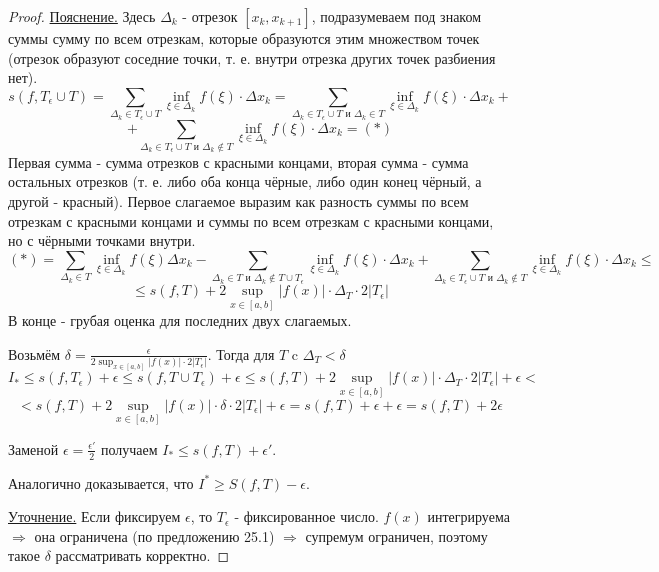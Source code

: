 \begin{proof}
    	\underline{Пояснение.} Здесь $\Delta_k$ - отрезок $[x_k, x_{k + 1}]$, подразумеваем под знаком суммы сумму по всем отрезкам, которые образуются этим множеством точек (отрезок образуют соседние точки, т. е. внутри отрезка других точек разбиения нет).
    	\[ s(f, T_{\epsilon} \cup T) = \sum_{\Delta_k \in T_{\epsilon} \cup T} \inf_{\xi \in \Delta_k} {f(\xi) \cdot \Delta x_k} = \sum_{\Delta_k \in T_{\epsilon} \cup T \text{ и } \Delta_k \in T} \inf_{\xi \in \Delta_k} {f(\xi) \cdot \Delta x_k} + \]
    	\[ + \sum_{\Delta_k \in T_{\epsilon} \cup T \text{ и } \Delta_k \not\in T} \inf_{\xi \in \Delta_k} {f(\xi) \cdot \Delta x_k} = (*) \]
    	Первая сумма - сумма отрезков с красными концами, вторая сумма - сумма остальных отрезков (т. е. либо оба конца чёрные, либо один конец чёрный, а другой - красный).
    	Первое слагаемое выразим как разность суммы по всем отрезкам с красными концами и суммы по всем отрезкам с красными концами, но с чёрными точками внутри.
    	\[ (*) = \sum_{\Delta_k \in T} \inf_{\xi \in \Delta_k} {f(\xi) \Delta x_k} - \sum_{\Delta_k \in T \text{ и } \Delta_k \not\in T \cup T_{\epsilon}} {\inf_{\xi \in \Delta_k} {f(\xi) \cdot \Delta x_k}} + \sum_{\Delta_k \in T_{\epsilon} \cup T \text{ и } \Delta_k \not\in T} {\inf_{\xi \in \Delta_k} {f(\xi) \cdot \Delta x_k}} \leqslant \]
    	\[ \leqslant s(f, T) + 2\sup_{x \in [a, b]} {|f(x)| \cdot \Delta_T \cdot 2|T_{\epsilon}|} \]
    	В конце - грубая оценка для последних двух слагаемых.
    	
    	Возьмём $\displaystyle \delta = \frac{\epsilon}{\displaystyle2\sup_{x \in [a, b]} {|f(x)| \cdot 2|T_{\epsilon}|}}$. Тогда для $T$ c $\Delta_T < \delta$
    	\[ I_{*} \leqslant s(f, T_{\epsilon}) + \epsilon \leqslant s(f, T \cup T_{\epsilon}) + \epsilon \leqslant s(f, T) + 2\sup_{x \in [a, b]} {|f(x)| \cdot \Delta_T \cdot 2|T_{\epsilon}|} + \epsilon < \]
    	\[ < s(f, T) + 2\sup_{x \in [a, b]} {|f(x)| \cdot \delta \cdot 2|T_{\epsilon}|} + \epsilon = s(f, T) + \epsilon + \epsilon = s(f, T) + 2\epsilon \]
    	
    	Заменой $\epsilon = \frac{\epsilon'}{2}$ получаем $I_{*} \leqslant s(f, T) + \epsilon'$.
    	
    	Аналогично доказывается, что $I^{*} \geqslant S(f, T) - \epsilon$.
    	
    	\underline{Уточнение.} Если фиксируем $\epsilon$, то $T_{\epsilon}$ - фиксированное число. $f(x)$ интегрируема $\Rightarrow$ она ограничена (по предложению 25.1) $\Rightarrow$ супремум ограничен, поэтому такое $\delta$ рассматривать корректно.
    \end{proof}
    
